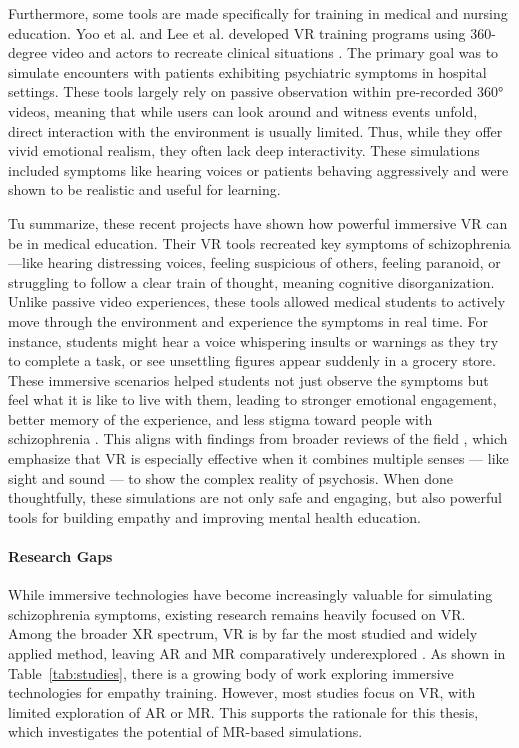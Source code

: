 \vspace{1em}

Furthermore, some tools are made specifically for training in medical and nursing education. Yoo et al. and Lee et al. developed VR training programs using 360-degree video and actors to recreate clinical situations \cite{Yoo2020, Lee2020}. The primary goal was to simulate encounters with patients exhibiting psychiatric symptoms in hospital settings. These tools largely rely on passive observation within pre-recorded 360° videos, meaning that while users can look around and witness events unfold, direct interaction with the environment is usually limited. Thus, while they offer vivid emotional realism, they often lack deep interactivity. These simulations included symptoms like hearing voices or patients behaving aggressively and were shown to be realistic and useful for learning.

\vspace{1em}

Tu summarize, these recent projects have shown how powerful immersive VR can be in medical education. Their VR tools recreated key symptoms of schizophrenia—like hearing distressing voices, feeling suspicious of others, feeling paranoid, or struggling to follow a clear train of thought, meaning cognitive disorganization. Unlike passive video experiences, these tools allowed medical students to actively move through the environment and experience the symptoms in real time. For instance, students might hear a voice whispering insults or warnings as they try to complete a task, or see unsettling figures appear suddenly in a grocery store. These immersive scenarios helped students not just observe the symptoms but feel what it is like to live with them, leading to stronger emotional engagement, better memory of the experience, and less stigma toward people with schizophrenia \cite{Kuhail2022,Domnick2023}. This aligns with findings from broader reviews of the field \cite{Lan2023,Bisso2020}, which emphasize that VR is especially effective when it combines multiple senses — like sight and sound — to show the complex reality of psychosis. When done thoughtfully, these simulations are not only safe and engaging, but also powerful tools for building empathy and improving mental health education.

\paragraph{Research Gaps}

While immersive technologies have become increasingly valuable for simulating schizophrenia symptoms, existing research remains heavily focused on VR. Among the broader XR spectrum, VR is by far the most studied and widely applied method, leaving AR and MR comparatively underexplored \cite{Kuhail2022}. As shown in Table~\ref{tab:studies}, there is a growing body of work exploring immersive technologies for empathy training. However, most studies focus on VR, with limited exploration of AR or MR. This supports the rationale for this thesis, which investigates the potential of MR-based simulations.

